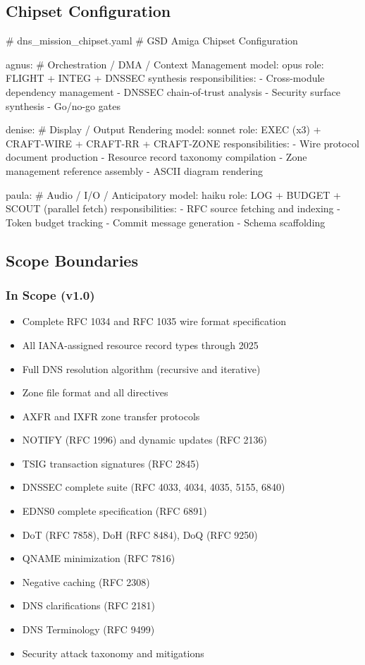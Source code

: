 \documentclass[11pt,letterpaper]{article}
\begin{document}
\subsection{Chipset Configuration}

\begin{asciibox}
# dns_mission_chipset.yaml
# GSD Amiga Chipset Configuration

agnus:          # Orchestration / DMA / Context Management
  model: opus
  role: FLIGHT + INTEG + DNSSEC synthesis
  responsibilities:
    - Cross-module dependency management
    - DNSSEC chain-of-trust analysis
    - Security surface synthesis
    - Go/no-go gates

denise:         # Display / Output Rendering
  model: sonnet
  role: EXEC (x3) + CRAFT-WIRE + CRAFT-RR + CRAFT-ZONE
  responsibilities:
    - Wire protocol document production
    - Resource record taxonomy compilation
    - Zone management reference assembly
    - ASCII diagram rendering

paula:          # Audio / I/O / Anticipatory
  model: haiku
  role: LOG + BUDGET + SCOUT (parallel fetch)
  responsibilities:
    - RFC source fetching and indexing
    - Token budget tracking
    - Commit message generation
    - Schema scaffolding
\end{asciibox}

\subsection{Scope Boundaries}

\subsubsection{In Scope (v1.0)}

\begin{itemize}
  \item Complete RFC 1034 and RFC 1035 wire format specification
  \item All IANA-assigned resource record types through 2025
  \item Full DNS resolution algorithm (recursive and iterative)
  \item Zone file format and all directives
  \item AXFR and IXFR zone transfer protocols
  \item NOTIFY (RFC 1996) and dynamic updates (RFC 2136)
  \item TSIG transaction signatures (RFC 2845)
  \item DNSSEC complete suite (RFC 4033, 4034, 4035, 5155, 6840)
  \item EDNS0 complete specification (RFC 6891)
  \item DoT (RFC 7858), DoH (RFC 8484), DoQ (RFC 9250)
  \item QNAME minimization (RFC 7816)
  \item Negative caching (RFC 2308)
  \item DNS clarifications (RFC 2181)
  \item DNS Terminology (RFC 9499)
  \item Security attack taxonomy and mitigations
\end{itemize}
\end{document}
